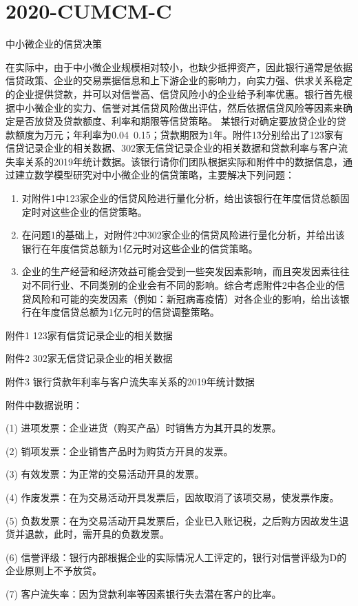 \documentclass[12pt]{ctexart}
\numberwithin{equation}{section} %
\begin{document}
\section{2020-CUMCM-C}
\begin{myex}
  中小微企业的信贷决策
 
  在实际中，由于中小微企业规模相对较小，也缺少抵押资产，因此银行通常是依据信贷政策、企业的交易票据信息和上下游企业的影响力，向实力强、供求关系稳定的企业提供贷款，并可以对信誉高、信贷风险小的企业给予利率优惠。银行首先根据中小微企业的实力、信誉对其信贷风险做出评估，然后依据信贷风险等因素来确定是否放贷及贷款额度、利率和期限等信贷策略。
  某银行对确定要放贷企业的贷款额度为万元；年利率为0.04~0.15；贷款期限为1年。附件1\~3分别给出了123家有信贷记录企业的相关数据、302家无信贷记录企业的相关数据和贷款利率与客户流失率关系的2019年统计数据。该银行请你们团队根据实际和附件中的数据信息，通过建立数学模型研究对中小微企业的信贷策略，主要解决下列问题：
\begin{enumerate}
  \item 对附件1中123家企业的信贷风险进行量化分析，给出该银行在年度信贷总额固定时对这些企业的信贷策略。
  \item 在问题1的基础上，对附件2中302家企业的信贷风险进行量化分析，并给出该银行在年度信贷总额为1亿元时对这些企业的信贷策略。
  \item  企业的生产经营和经济效益可能会受到一些突发因素影响，而且突发因素往往对不同行业、不同类别的企业会有不同的影响。综合考虑附件2中各企业的信贷风险和可能的突发因素（例如：新冠病毒疫情）对各企业的影响，给出该银行在年度信贷总额为1亿元时的信贷调整策略。
\end{enumerate}
  附件1  123家有信贷记录企业的相关数据

  附件2  302家无信贷记录企业的相关数据

  附件3  银行贷款年利率与客户流失率关系的2019年统计数据
  
  附件中数据说明：

  (1) 进项发票：企业进货（购买产品）时销售方为其开具的发票。
  
  (2) 销项发票：企业销售产品时为购货方开具的发票。
  
  (3) 有效发票：为正常的交易活动开具的发票。
  
  (4) 作废发票：在为交易活动开具发票后，因故取消了该项交易，使发票作废。
  
  (5) 负数发票：在为交易活动开具发票后，企业已入账记税，之后购方因故发生退货并退款，此时，需开具的负数发票。
  
  (6) 信誉评级：银行内部根据企业的实际情况人工评定的，银行对信誉评级为D的企业原则上不予放贷。
  
  (7) 客户流失率：因为贷款利率等因素银行失去潜在客户的比率。
\end{myex}
\end{document}
